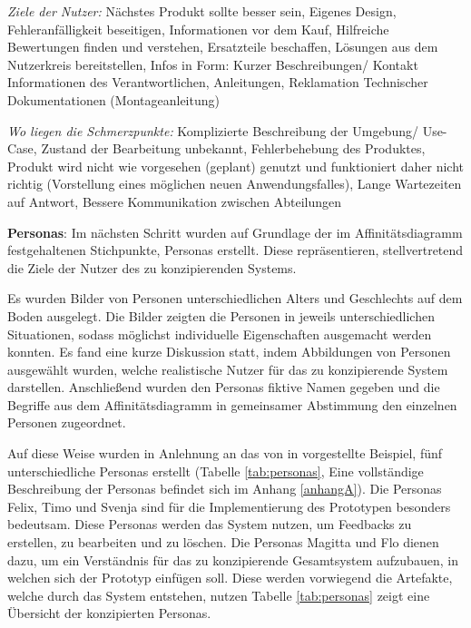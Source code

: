 \vspace{2mm}
\textit{Ziele der Nutzer: } 
Nächstes Produkt sollte besser sein, Eigenes Design, Fehleranfälligkeit beseitigen, Informationen vor dem Kauf, Hilfreiche Bewertungen finden und verstehen, Ersatzteile beschaffen, Lösungen aus dem Nutzerkreis bereitstellen, Infos in Form: Kurzer Beschreibungen/ Kontakt Informationen des Verantwortlichen, Anleitungen, Reklamation Technischer Dokumentationen (Montageanleitung)

\vspace{2mm}
\textit{Wo liegen die Schmerzpunkte: } 
Komplizierte Beschreibung der Umgebung/ Use-Case, Zustand der Bearbeitung unbekannt, Fehlerbehebung des Produktes, Produkt wird nicht wie vorgesehen (geplant) genutzt und funktioniert daher nicht richtig (Vorstellung eines möglichen neuen Anwendungsfalles), Lange Wartezeiten auf Antwort, Bessere Kommunikation zwischen Abteilungen

\textbf{Personas}:
Im nächsten Schritt wurden auf Grundlage der im  Affinitätsdiagramm festgehaltenen Stichpunkte, Personas erstellt. Diese repräsentieren, stellvertretend die Ziele der 
Nutzer des zu konzipierenden Systems.

Es wurden Bilder von Personen unterschiedlichen Alters und Geschlechts auf dem Boden ausgelegt. Die Bilder zeigten die Personen in jeweils unterschiedlichen Situationen, 
sodass möglichst individuelle Eigenschaften ausgemacht werden konnten. Es fand eine kurze Diskussion statt, indem Abbildungen von Personen ausgewählt wurden, welche realistische 
Nutzer für das zu konzipierende System darstellen. Anschließend wurden den Personas fiktive Namen gegeben und die Begriffe aus dem Affinitätsdiagramm in gemeinsamer Abstimmung den 
einzelnen Personen zugeordnet. 

Auf diese Weise wurden in Anlehnung an das von \citeauthor{MichaelRichter2016} in \cite[S.~57]{MichaelRichter2016} vorgestellte Beispiel, fünf unterschiedliche Personas erstellt (Tabelle \ref{tab:personas}, Eine vollständige Beschreibung der Personas befindet sich im Anhang \ref{anhangA}). Die Personas Felix, Timo und Svenja sind für die Implementierung des Prototypen besonders bedeutsam. Diese Personas werden das System nutzen, um Feedbacks zu erstellen, 
zu bearbeiten und zu löschen. Die Personas Magitta und Flo dienen dazu, um ein Verständnis für das zu konzipierende Gesamtsystem aufzubauen, in welchen sich der Prototyp einfügen soll. Diese werden vorwiegend die Artefakte, welche durch das System entstehen, nutzen  Tabelle \ref{tab:personas} zeigt eine Übersicht der konzipierten Personas. 

